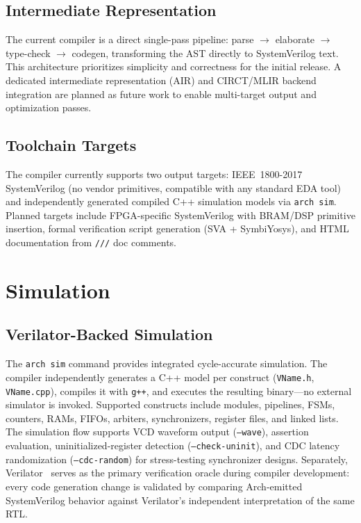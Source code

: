 \documentclass[11pt,twocolumn]{article}
\begin{document}
\subsection{Intermediate Representation}

The current compiler is a direct single-pass pipeline: parse $\to$ elaborate $\to$ type-check $\to$ codegen, transforming the AST directly to SystemVerilog text. This architecture prioritizes simplicity and correctness for the initial release. A dedicated intermediate representation (AIR) and CIRCT/MLIR backend integration are planned as future work to enable multi-target output and optimization passes.

\subsection{Toolchain Targets}

The compiler currently supports two output targets:
IEEE~1800-2017 SystemVerilog (no vendor primitives, compatible with any standard EDA tool) and
independently generated compiled C++ simulation models via \texttt{arch sim}.
Planned targets include FPGA-specific SystemVerilog with BRAM/DSP primitive insertion, formal verification script generation (SVA + SymbiYosys), and HTML documentation from \texttt{///} doc comments.

\section{Simulation}\label{sec:sim}

\subsection{Verilator-Backed Simulation}

The \texttt{arch sim} command provides integrated cycle-accurate simulation. The compiler independently generates a C++ model per construct (\texttt{VName.h}, \texttt{VName.cpp}), compiles it with \texttt{g++}, and executes the resulting binary---no external simulator is invoked. Supported constructs include modules, pipelines, FSMs, counters, RAMs, FIFOs, arbiters, synchronizers, register files, and linked lists. The simulation flow supports VCD waveform output (\texttt{--wave}), assertion evaluation, uninitialized-register detection (\texttt{--check-uninit}), and CDC latency randomization (\texttt{--cdc-random}) for stress-testing synchronizer designs. Separately, Verilator~\cite{verilator} serves as the primary verification oracle during compiler development: every code generation change is validated by comparing Arch-emitted SystemVerilog behavior against Verilator's independent interpretation of the same RTL.
\end{document}
